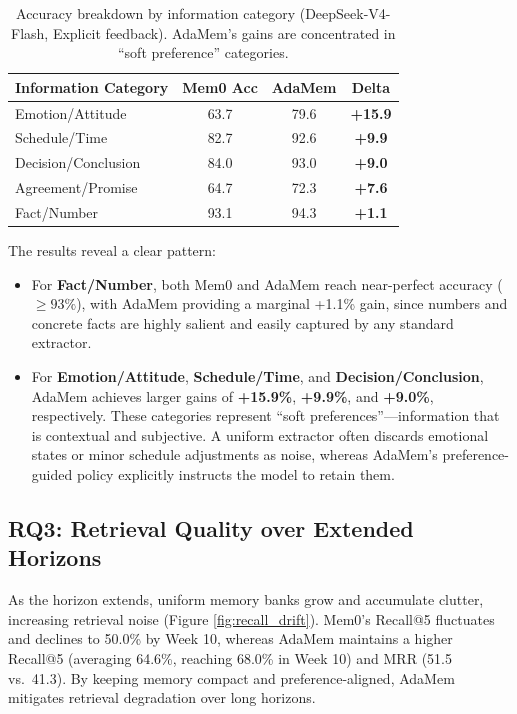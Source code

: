 \documentclass[11pt]{article}
\begin{document}
\begin{table}[h]
\centering
\small
\begin{tabular}{lccc}
\toprule
\textbf{Information Category} & \textbf{Mem0 Acc} & \textbf{AdaMem} & \textbf{Delta} \\
\midrule
Emotion/Attitude & 63.7 & 79.6 & \textbf{+15.9} \\
Schedule/Time & 82.7 & 92.6 & \textbf{+9.9} \\
Decision/Conclusion & 84.0 & 93.0 & \textbf{+9.0} \\
Agreement/Promise & 64.7 & 72.3 & \textbf{+7.6} \\
Fact/Number & 93.1 & 94.3 & \textbf{+1.1} \\
\bottomrule
\end{tabular}
\caption{Accuracy breakdown by information category (DeepSeek-V4-Flash, Explicit feedback). AdaMem's gains are concentrated in ``soft preference'' categories.}
\label{tab:info_category}
\end{table}

The results reveal a clear pattern:
\begin{itemize}
    \item For \textbf{Fact/Number}, both Mem0 and AdaMem reach near-perfect accuracy ($\ge 93\%$), with AdaMem providing a marginal +1.1\% gain, since numbers and concrete facts are highly salient and easily captured by any standard extractor.
    \item For \textbf{Emotion/Attitude}, \textbf{Schedule/Time}, and \textbf{Decision/Conclusion}, AdaMem achieves larger gains of \textbf{+15.9\%}, \textbf{+9.9\%}, and \textbf{+9.0\%}, respectively. These categories represent ``soft preferences''---information that is contextual and subjective. A uniform extractor often discards emotional states or minor schedule adjustments as noise, whereas AdaMem's preference-guided policy explicitly instructs the model to retain them.
\end{itemize}

\subsection{RQ3: Retrieval Quality over Extended Horizons}
As the horizon extends, uniform memory banks grow and accumulate clutter, increasing retrieval noise (Figure \ref{fig:recall_drift}). Mem0's Recall@5 fluctuates and declines to 50.0\% by Week 10, whereas AdaMem maintains a higher Recall@5 (averaging 64.6\%, reaching 68.0\% in Week 10) and MRR (51.5 vs.\ 41.3). By keeping memory compact and preference-aligned, AdaMem mitigates retrieval degradation over long horizons.
\end{document}

